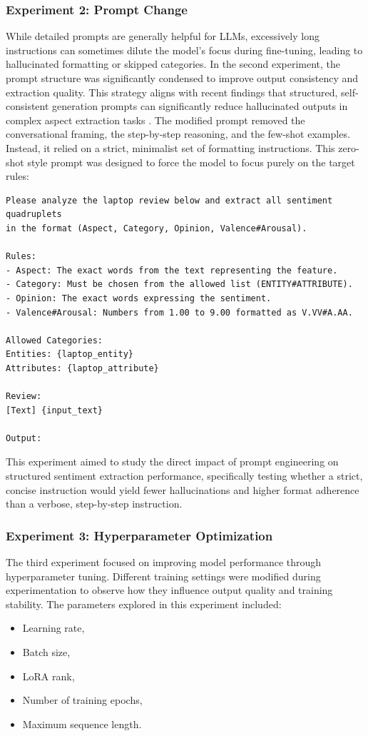 \documentclass{article}
\begin{document}
\subsubsection{Experiment 2: Prompt Change}

While detailed prompts are generally helpful for LLMs, excessively long instructions can sometimes dilute the model's focus during fine-tuning, leading to hallucinated formatting or skipped categories. In the second experiment, the prompt structure was significantly condensed to improve output consistency and extraction quality. This strategy aligns with recent findings that structured, self-consistent generation prompts can significantly reduce hallucinated outputs in complex aspect extraction tasks \cite{hellwig2026nchellwig}. The modified prompt removed the conversational framing, the step-by-step reasoning, and the few-shot examples. Instead, it relied on a strict, minimalist set of formatting instructions. This zero-shot style prompt was designed to force the model to focus purely on the target rules:

\begin{verbatim}
Please analyze the laptop review below and extract all sentiment quadruplets 
in the format (Aspect, Category, Opinion, Valence#Arousal).

Rules:
- Aspect: The exact words from the text representing the feature.
- Category: Must be chosen from the allowed list (ENTITY#ATTRIBUTE).
- Opinion: The exact words expressing the sentiment.
- Valence#Arousal: Numbers from 1.00 to 9.00 formatted as V.VV#A.AA.

Allowed Categories:
Entities: {laptop_entity}
Attributes: {laptop_attribute}

Review:
[Text] {input_text}

Output:
\end{verbatim}

This experiment aimed to study the direct impact of prompt engineering on structured sentiment extraction performance, specifically testing whether a strict, concise instruction would yield fewer hallucinations and higher format adherence than a verbose, step-by-step instruction.

\subsubsection{Experiment 3: Hyperparameter Optimization}

The third experiment focused on improving model performance through hyperparameter tuning. Different training settings were modified during experimentation to observe how they influence output quality and training stability. The parameters explored in this experiment included:
\begin{itemize}
    \item Learning rate,
    \item Batch size,
    \item LoRA rank,
    \item Number of training epochs,
    \item Maximum sequence length.
\end{itemize}
\end{document}
